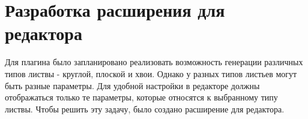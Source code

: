 \section{Разработка расширения для редактора}
Для плагина было запланировано реализовать возможность генерации различных типов листвы - круглой, плоской и хвои. Однако у разных типов листьев могут быть разные параметры. Для удобной настройки в редакторе должны отображаться только те параметры, которые относятся к выбранному типу листвы. Чтобы решить эту задачу, было создано расширение для редактора.



\newpage
